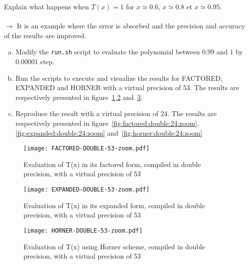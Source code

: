 \begin{question}
  Explain what happens when $T(x)=1$ for $x\simeq 0.6$,
  $x\simeq 0.8$ et $x\simeq 0.95$.\\~\\
  $\rightarrow$ It is an example where the error is absorbed and the precision and accuracy  of the results are improved.
\end{question}


\begin{question}
  \begin{enumerate}[(a)]
    \item Modify the {\tt run.sh} script to evaluate the  polynomial between $0.99$ and $1$ by $0.00001$ step.
  \item Run the scripts to execute and visualize the results for
    FACTORED, EXPANDED and HORNER with a virtual precision of 53. The results are respectively presented in figure~\ref{fig:factored:double:53:zoom},\ref{fig:expanded:double:53:zoom}
    and~\ref{fig:horner:double:53:zoom}.

\item Reproduce the result with a virtual precision of 24. The results are respectively presented in figure~\ref{fig:factored:double:24:zoom},\ref{fig:expanded:double:24:zoom}
    and~\ref{fig:horner:double:24:zoom}

\end{enumerate}
\end{question}

\begin{figure}[h]
  \center \texttt{[image: FACTORED-DOUBLE-53-zoom.pdf]}
  \caption{Evaluation of T(x) in its factored form, compiled in double
    precision, with a virtual precision of 53}
  \label{fig:factored:double:53:zoom}
\end{figure}

\begin{figure}[h]
  \center \texttt{[image: EXPANDED-DOUBLE-53-zoom.pdf]}
  \caption{Evaluation of T(x) in its expanded form, compiled in double
    precision, with a virtual precision of 53}
  \label{fig:expanded:double:53:zoom}
\end{figure}

\begin{figure}[h]
  \center \texttt{[image: HORNER-DOUBLE-53-zoom.pdf]}
  \caption{Evaluation of T(x) using Horner scheme, compiled in double precision,
    with a virtual precision of 53}
  \label{fig:horner:double:53:zoom}
\end{figure}

